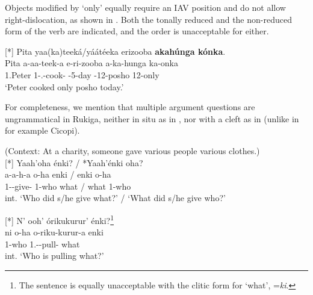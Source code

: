 \documentclass[output=paper]{langscibook}
\begin{document}
\z
\z


Objects modified by ‘only’ equally require an IAV position and do not allow right-dislocation, as shown in . Both the tonally reduced and the non-reduced form of the verb are indicated, and the order is unacceptable for either.

\ea
\label{bkm:Ref111462661}


\ex
[*]{
Pita yaa(ka)teeká/yáátéeka erizooba \textbf{akahúnga kónka}.\\
\gll
Pita  a-aa-teek-a  e-ri-zooba  a-ka-hunga  ka-onka\\
1.Peter  1\SM{}-\N{}.\PST{}-cook-\FV{}  \AUG{}-5-day  \AUG{}-12-posho  12-only\\
\glt
‘Peter cooked only posho today.’\\
}


\z
\z

For completeness, we mention that multiple argument questions are ungrammatical in Rukiga, neither in situ as in , nor with a cleft as in  (unlike in for example Cicopi).

\ea
\label{bkm:Ref116292843}
(Context: At a charity, someone gave various people various clothes.)\\
\sn
[*]{
Yaah’oha énki? / *Yaah’énki oha?\\
\gll
a-a-h-a  o-ha  enki  / enki  o-ha\\
1\SM{}-\PST{}-give-\FV{}  1-who  what  / what  1-who\\
\glt
int. ‘Who did s/he give what?’ / ‘What did s/he give who?’\\
}


\z

\ea
[*]{
\label{bkm:Ref116292868}
N’ ooh’ órikukurur’ énki?\footnote{The sentence is equally unacceptable with the clitic form for ‘what’, =\textit{ki}.}\\
\gll
ni  o-ha  o-riku-kurur-a  enki\\
\COP{}  1-who  1\SM{}.\REL{}-\IPFV{}-pull-\FV{}  what\\
\glt
int. ‘Who is pulling what?’\\
}
\end{document}
